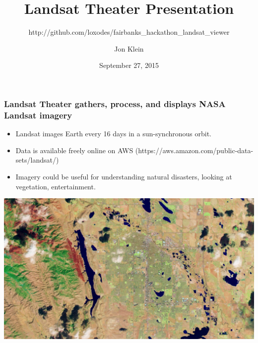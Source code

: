 \documentclass{beamer}
\title{Landsat Theater Presentation}
\subtitle{http://github.com/loxodes/fairbanks\_hackathon\_landsat\_viewer}
\author{Jon Klein}
\institute{University of Alaska, Fairbanks}
\date{September 27, 2015}
\begin{document}
    \begin{frame}
        \titlepage
    \end{frame}

    \begin{frame}
        \frametitle{Landsat Theater gathers, process, and displays NASA Landsat imagery}
        \begin{itemize}
            \item Landsat images Earth every 16 days in a sun-synchronous orbit.
            \item Data is available freely online on AWS (https://aws.amazon.com/public-data-sets/landsat/)
            \item Imagery could be useful for understanding natural disasters, looking at vegetation, entertainment.
        \end{itemize}

        \includegraphics[width=.45\paperheight]{figures/landsatcolorado.jpg}
    \end{frame}
 
\end{document}
